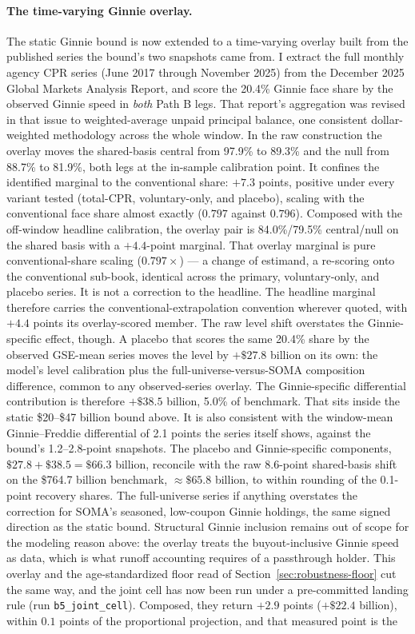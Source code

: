 \documentclass[12pt]{article}
\begin{document}
\paragraph{The time-varying Ginnie overlay.}
The static Ginnie bound is now extended to a time-varying overlay built from the published series the bound's two snapshots came from. I extract the full monthly agency CPR series (June 2017 through November 2025) from the December 2025 Global Markets Analysis Report, and score the 20.4\% Ginnie face share by the observed Ginnie speed in \emph{both} Path B legs. That report's aggregation was revised in that issue to weighted-average unpaid principal balance, one consistent dollar-weighted methodology across the whole window. In the raw construction the overlay moves the shared-basis central from 97.9\% to 89.3\% and the null from 88.7\% to 81.9\%, both legs at the in-sample calibration point. It confines the identified marginal to the conventional share: $+7.3$ points, positive under every variant tested (total-CPR, voluntary-only, and placebo), scaling with the conventional face share almost exactly ($0.797$ against $0.796$). Composed with the off-window headline calibration, the overlay pair is 84.0\%/79.5\% central/null on the shared basis with a $+4.4$-point marginal. That overlay marginal is pure conventional-share scaling ($0.797\times$) --- a change of estimand, a re-scoring onto the conventional sub-book, identical across the primary, voluntary-only, and placebo series. It is not a correction to the headline. The headline marginal therefore carries the conventional-extrapolation convention wherever quoted, with $+4.4$ points its overlay-scored member. The raw level shift overstates the Ginnie-specific effect, though. A placebo that scores the same 20.4\% share by the observed GSE-mean series moves the level by $+\$27.8$ billion on its own: the model's level calibration plus the full-universe-versus-SOMA composition difference, common to any observed-series overlay. The Ginnie-specific differential contribution is therefore $+\$38.5$ billion, 5.0\% of benchmark. That sits inside the static \$20--\$47 billion bound above. It is also consistent with the window-mean Ginnie--Freddie differential of 2.1 points the series itself shows, against the bound's 1.2--2.8-point snapshots. The placebo and Ginnie-specific components, $\$27.8 + \$38.5 = \$66.3$ billion, reconcile with the raw 8.6-point shared-basis shift on the \$764.7 billion benchmark, $\approx\$65.8$ billion, to within rounding of the 0.1-point recovery shares. The full-universe series if anything overstates the correction for SOMA's seasoned, low-coupon Ginnie holdings, the same signed direction as the static bound. Structural Ginnie inclusion remains out of scope for the modeling reason above: the overlay treats the buyout-inclusive Ginnie speed as data, which is what runoff accounting requires of a passthrough holder. This overlay and the age-standardized floor read of Section~\ref{sec:robustness-floor} cut the same way, and the joint cell has now been run under a pre-committed landing rule (run \texttt{b5\_joint\_cell}). Composed, they return $+2.9$ points ($+\$22.4$ billion), within $0.1$ points of the proportional projection, and that measured point is the 
\end{document}
